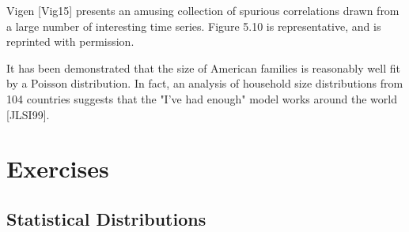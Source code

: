 \documentclass[10pt]{article}
\begin{document}
Vigen [Vig15] presents an amusing collection of spurious correlations drawn from a large number of interesting time series. Figure 5.10 is representative, and is reprinted with permission.

It has been demonstrated that the size of American families is reasonably well fit by a Poisson distribution. In fact, an analysis of household size distributions from 104 countries suggests that the "I've had enough" model works around the world [JLSI99].

\section{Exercises}

\subsection*{Statistical Distributions}
\end{document}
